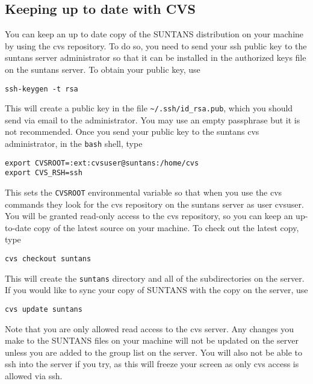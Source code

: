 \subsection{Keeping up to date with CVS}

You can keep an up to date copy of the SUNTANS distribution on your machine by using the
cvs repository.  To do so, you need to send your ssh public key to the suntans server administrator so that
it can be installed in the authorized keys file on the suntans server.  To obtain your
public key, use
\begin{verbatim}
ssh-keygen -t rsa
\end{verbatim}
This will create a public key in the file \verb+~/.ssh/id_rsa.pub+, which you should send
via email to the administrator.  You may use an empty passphrase but it is not recommended.
Once you send your public key to the suntans cvs administrator, in the \verb+bash+ shell, type
\begin{verbatim}
export CVSROOT=:ext:cvsuser@suntans:/home/cvs
export CVS_RSH=ssh
\end{verbatim}
This sets the \verb+CVSROOT+ environmental variable so that when you use the cvs commands
they look for the cvs repository on the suntans server as user cvsuser.
You will be granted read-only access to the cvs repository, so you can keep an up-to-date
copy of the latest source on your machine.  To check out the latest copy, type
\begin{verbatim}
cvs checkout suntans
\end{verbatim}
This will create the \verb+suntans+ directory and all of the subdirectories on the server.
If you would like to sync your copy of SUNTANS with the copy on the server, use
\begin{verbatim}
cvs update suntans
\end{verbatim}
Note that you are only allowed read access to the cvs server.  Any changes you make to
the SUNTANS files on your machine will not be updated on the server unless you are added
to the group list on the server.  You will also not be able to ssh into the server if you
try, as this will freeze your screen as only cvs access is allowed via ssh.
